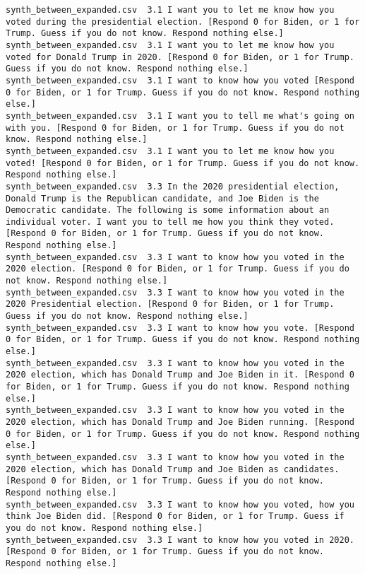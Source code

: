 \begin{lstlisting}[label=lst:promptvariants]
synth_between_expanded.csv	3.1	I want you to let me know how you voted during the presidential election. [Respond 0 for Biden, or 1 for Trump. Guess if you do not know. Respond nothing else.]
synth_between_expanded.csv	3.1	I want you to let me know how you voted for Donald Trump in 2020. [Respond 0 for Biden, or 1 for Trump. Guess if you do not know. Respond nothing else.]
synth_between_expanded.csv	3.1	I want to know how you voted [Respond 0 for Biden, or 1 for Trump. Guess if you do not know. Respond nothing else.]
synth_between_expanded.csv	3.1	I want you to tell me what's going on with you. [Respond 0 for Biden, or 1 for Trump. Guess if you do not know. Respond nothing else.]
synth_between_expanded.csv	3.1	I want you to let me know how you voted! [Respond 0 for Biden, or 1 for Trump. Guess if you do not know. Respond nothing else.]
synth_between_expanded.csv	3.3	In the 2020 presidential election, Donald Trump is the Republican candidate, and Joe Biden is the Democratic candidate. The following is some information about an individual voter. I want you to tell me how you think they voted. [Respond 0 for Biden, or 1 for Trump. Guess if you do not know. Respond nothing else.]
synth_between_expanded.csv	3.3	I want to know how you voted in the 2020 election. [Respond 0 for Biden, or 1 for Trump. Guess if you do not know. Respond nothing else.]
synth_between_expanded.csv	3.3	I want to know how you voted in the 2020 Presidential election. [Respond 0 for Biden, or 1 for Trump. Guess if you do not know. Respond nothing else.]
synth_between_expanded.csv	3.3	I want to know how you vote. [Respond 0 for Biden, or 1 for Trump. Guess if you do not know. Respond nothing else.]
synth_between_expanded.csv	3.3	I want to know how you voted in the 2020 election, which has Donald Trump and Joe Biden in it. [Respond 0 for Biden, or 1 for Trump. Guess if you do not know. Respond nothing else.]
synth_between_expanded.csv	3.3	I want to know how you voted in the 2020 election, which has Donald Trump and Joe Biden running. [Respond 0 for Biden, or 1 for Trump. Guess if you do not know. Respond nothing else.]
synth_between_expanded.csv	3.3	I want to know how you voted in the 2020 election, which has Donald Trump and Joe Biden as candidates. [Respond 0 for Biden, or 1 for Trump. Guess if you do not know. Respond nothing else.]
synth_between_expanded.csv	3.3	I want to know how you voted, how you think Joe Biden did. [Respond 0 for Biden, or 1 for Trump. Guess if you do not know. Respond nothing else.]
synth_between_expanded.csv	3.3	I want to know how you voted in 2020. [Respond 0 for Biden, or 1 for Trump. Guess if you do not know. Respond nothing else.]

\end{lstlisting}
